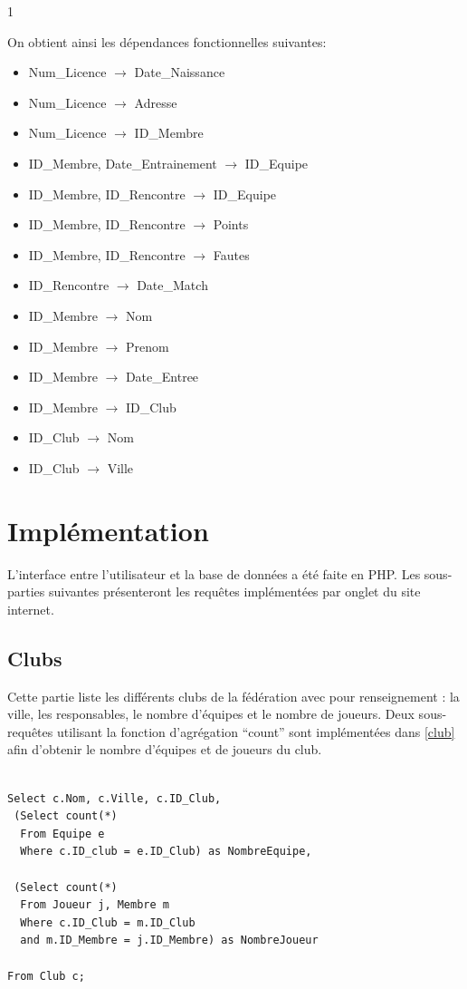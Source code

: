 1\documentclass[a4paper»,8pt,french,fleqn]{report}
\begin{document}
On obtient ainsi les dépendances fonctionnelles suivantes: \\

\begin{itemize}

\item Num\_Licence $\rightarrow$ Date\_Naissance
\item Num\_Licence $\rightarrow$ Adresse
\item Num\_Licence $\rightarrow$ ID\_Membre
\item ID\_Membre, Date\_Entrainement $\rightarrow$ ID\_Equipe
\item ID\_Membre, ID\_Rencontre $\rightarrow$ ID\_Equipe
\item ID\_Membre, ID\_Rencontre $\rightarrow$ Points
\item ID\_Membre, ID\_Rencontre $\rightarrow$ Fautes
\item ID\_Rencontre $\rightarrow$ Date\_Match
\item ID\_Membre $\rightarrow$ Nom
\item ID\_Membre $\rightarrow$ Prenom
\item ID\_Membre $\rightarrow$ Date\_Entree
\item ID\_Membre $\rightarrow$ ID\_Club
\item ID\_Club $\rightarrow$ Nom
\item ID\_Club $\rightarrow$ Ville

\end{itemize}

\chapter{Implémentation}

L'interface entre l'utilisateur et la base de données a été faite en PHP. Les sous-parties suivantes présenteront les requêtes implémentées par onglet du site internet.

\section{Clubs}

Cette partie liste les différents clubs de la fédération avec pour renseignement : la ville, les responsables, le nombre d'équipes et le nombre de joueurs. Deux sous-requêtes utilisant la fonction d'agrégation ``count'' sont implémentées dans \ref{club} afin d'obtenir le nombre d'équipes et de joueurs du club. 

\begin{lstlisting}

Select c.Nom, c.Ville, c.ID_Club,
 (Select count(*) 
  From Equipe e
  Where c.ID_club = e.ID_Club) as NombreEquipe,

 (Select count(*) 
  From Joueur j, Membre m
  Where c.ID_Club = m.ID_Club
  and m.ID_Membre = j.ID_Membre) as NombreJoueur

From Club c;
\end{lstlisting}
\end{document}
